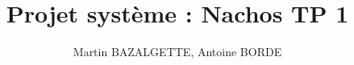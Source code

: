 \documentclass[12pt]{article}
\begin{document}
\title{Projet système : Nachos TP 1}
\author{Martin BAZALGETTE, Antoine BORDE}

\maketitle
\newpage
\tableofcontents
\newpage
\end{document}
